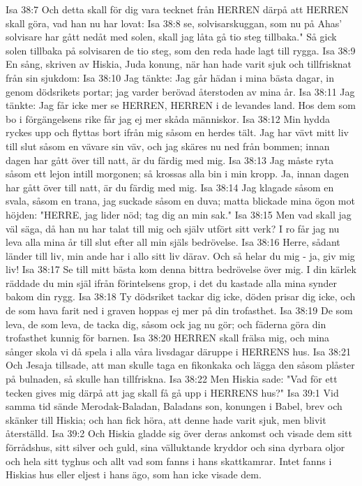 Isa 38:7  Och detta skall för dig vara tecknet från HERREN därpå att HERREN skall göra, vad han nu har lovat:
Isa 38:8  se, solvisarskuggan, som nu på Ahas' solvisare har gått nedåt med solen, skall jag låta gå tio steg tillbaka." Så gick solen tillbaka på solvisaren de tio steg, som den reda hade lagt till rygga.
Isa 38:9  En sång, skriven av Hiskia, Juda konung, när han hade varit sjuk och tillfrisknat från sin sjukdom:
Isa 38:10  Jag tänkte: Jag går hädan i mina bästa dagar, in genom dödsrikets portar; jag varder berövad återstoden av mina år.
Isa 38:11  Jag tänkte: Jag får icke mer se HERREN, HERREN i de levandes land. Hos dem som bo i förgängelsens rike får jag ej mer skåda människor.
Isa 38:12  Min hydda ryckes upp och flyttas bort ifrån mig såsom en herdes tält. Jag har vävt mitt liv till slut såsom en vävare sin väv, och jag skäres nu ned från bommen; innan dagen har gått över till natt, är du färdig med mig.
Isa 38:13  Jag måste ryta såsom ett lejon intill morgonen; så krossas alla bin i min kropp. Ja, innan dagen har gått över till natt, är du färdig med mig.
Isa 38:14  Jag klagade såsom en svala, såsom en trana, jag suckade såsom en duva; matta blickade mina ögon mot höjden: "HERRE, jag lider nöd; tag dig an min sak."
Isa 38:15  Men vad skall jag väl säga, då han nu har talat till mig och själv utfört sitt verk? I ro får jag nu leva alla mina år till slut efter all min själs bedrövelse.
Isa 38:16  Herre, sådant länder till liv, min ande har i allo sitt liv därav. Och så helar du mig - ja, giv mig liv!
Isa 38:17  Se till mitt bästa kom denna bittra bedrövelse över mig. I din kärlek räddade du min själ ifrån förintelsens grop, i det du kastade alla mina synder bakom din rygg.
Isa 38:18  Ty dödsriket tackar dig icke, döden prisar dig icke, och de som hava farit ned i graven hoppas ej mer på din trofasthet.
Isa 38:19  De som leva, de som leva, de tacka dig, såsom ock jag nu gör; och fäderna göra din trofasthet kunnig för barnen.
Isa 38:20  HERREN skall frälsa mig, och mina sånger skola vi då spela i alla våra livsdagar däruppe i HERRENS hus.
Isa 38:21  Och Jesaja tillsade, att man skulle taga en fikonkaka och lägga den såsom plåster på bulnaden, så skulle han tillfriskna.
Isa 38:22  Men Hiskia sade: "Vad för ett tecken gives mig därpå att jag skall få gå upp i HERRENS hus?"
Isa 39:1  Vid samma tid sände Merodak-Baladan, Baladans son, konungen i Babel, brev och skänker till Hiskia; och han fick höra, att denne hade varit sjuk, men blivit återställd.
Isa 39:2  Och Hiskia gladde sig över deras ankomst och visade dem sitt förrådshus, sitt silver och guld, sina välluktande kryddor och sina dyrbara oljor och hela sitt tyghus och allt vad som fanns i hans skattkamrar. Intet fanns i Hiskias hus eller eljest i hans ägo, som han icke visade dem.
